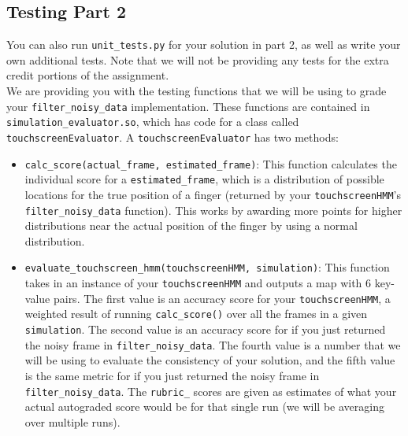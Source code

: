 \documentclass{article}
\begin{document}
    \subsection{Testing Part 2}
    You can also run \texttt{unit\_tests.py} for your solution in part 2, as well as write your own additional tests. Note that we will not be providing any tests for the extra credit portions of the assignment.\\
    
    We are providing you with the testing functions that we will be using to grade your \texttt{filter\_noisy\_data} implementation. These functions are contained in \texttt{simulation\_evaluator.so}, which has code for a class called \texttt{touchscreenEvaluator}. A \texttt{touchscreenEvaluator} has two methods:
    \begin{itemize}
        \item \texttt{calc\_score(actual\_frame, estimated\_frame)}:
        This function calculates the individual score for a \texttt{estimated\_frame}, which is a distribution of possible locations for the true position of a finger (returned by your \texttt{touchscreenHMM}'s \texttt{filter\_noisy\_data} function). This works by awarding more points for higher distributions near the actual position of the finger by using a normal distribution.
        \item \texttt{evaluate\_touchscreen\_hmm(touchscreenHMM, simulation)}:
        This function takes in an instance of your \texttt{touchscreenHMM} and outputs a map with 6 key-value pairs. The first value is an accuracy score for your \texttt{touchscreenHMM}, a weighted result of running \texttt{calc\_score()} over all the frames in a given \texttt{simulation}. The second value is an accuracy score for if you just returned the noisy frame in \texttt{filter\_noisy\_data}. The fourth value is a number that we will be using to evaluate the consistency of your solution, and the fifth value is the same metric for if you just returned the noisy frame in \texttt{filter\_noisy\_data}. The \texttt{rubric\_} scores are given as estimates of what your actual autograded score would be for that single run (we will be averaging over multiple runs).
    \end{itemize}
    
\end{document}
